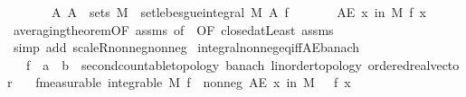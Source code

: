 \begin{isabellebody}
\ \ \ \ \ \ \ {\isachardoublequoteopen}{\isasymAnd}A{\isachardot}{\kern0pt}\ A\ {\isasymin}\ sets\ M\ {\isasymLongrightarrow}\ set{\isacharunderscore}{\kern0pt}lebesgue{\isacharunderscore}{\kern0pt}integral\ M\ A\ f\ {\isasymge}\ {}{\isachardoublequoteclose}\isanewline
\ \ \ \ \ {\isachardoublequoteopen}AE\ x\ in\ M{\isachardot}{\kern0pt}\ f\ x\ {\isasymge}\ {}{\isachardoublequoteclose}\isanewline
%
\isadelimproof
\ \ %
\endisadelimproof
%
\isatagproof
{}\isamarkupfalse%
\ averaging{\isacharunderscore}{\kern0pt}theorem{\isacharbrackleft}{\kern0pt}OF\ assms{\isacharparenleft}{\kern0pt}{}{\isacharparenright}{\kern0pt}{\isacharcomma}{\kern0pt}\ of\ {\isachardoublequoteopen}{\isacharbraceleft}{\kern0pt}{}{\isachardot}{\kern0pt}{\isachardot}{\kern0pt}{\isacharbraceright}{\kern0pt}{\isachardoublequoteclose}{\isacharcomma}{\kern0pt}\ OF\ closed{\isacharunderscore}{\kern0pt}atLeast{\isacharbrackright}{\kern0pt}\ assms{\isacharparenleft}{\kern0pt}{}{\isacharparenright}{\kern0pt}\isanewline
\ \ \isamarkupfalse%
\ {\isacharparenleft}{\kern0pt}simp\ add{\isacharcolon}{\kern0pt}\ scaleR{\isacharunderscore}{\kern0pt}nonneg{\isacharunderscore}{\kern0pt}nonneg{\isacharparenright}{\kern0pt}%
\endisatagproof
{\isafoldproof}%
%
\isadelimproof
\isanewline
%
\endisadelimproof
\isanewline
{}\isamarkupfalse%
\ integral{\isacharunderscore}{\kern0pt}nonneg{\isacharunderscore}{\kern0pt}eq{\isacharunderscore}{\kern0pt}{}{\isacharunderscore}{\kern0pt}iff{\isacharunderscore}{\kern0pt}AE{\isacharunderscore}{\kern0pt}banach{\isacharcolon}{\kern0pt}\isanewline
\ \ \ f\ {\isacharcolon}{\kern0pt}{\isacharcolon}{\kern0pt}\ {\isachardoublequoteopen}{\isacharprime}{\kern0pt}a\ {\isasymRightarrow}\ {\isacharprime}{\kern0pt}b\ {\isacharcolon}{\kern0pt}{\isacharcolon}{\kern0pt}\ {\isacharbraceleft}{\kern0pt}second{\isacharunderscore}{\kern0pt}countable{\isacharunderscore}{\kern0pt}topology{\isacharcomma}{\kern0pt}\ banach{\isacharcomma}{\kern0pt}\ linorder{\isacharunderscore}{\kern0pt}topology{\isacharcomma}{\kern0pt}\ ordered{\isacharunderscore}{\kern0pt}real{\isacharunderscore}{\kern0pt}vector{\isacharbraceright}{\kern0pt}{\isachardoublequoteclose}\isanewline
\ \ \ f{\isacharbrackleft}{\kern0pt}measurable{\isacharbrackright}{\kern0pt}{\isacharcolon}{\kern0pt}\ {\isachardoublequoteopen}integrable\ M\ f{\isachardoublequoteclose}\ \ nonneg{\isacharcolon}{\kern0pt}\ {\isachardoublequoteopen}AE\ x\ in\ M{\isachardot}{\kern0pt}\ {}\ {\isasymle}\ f\ x{\isachardoublequoteclose}\isanewline

\end{isabellebody}

